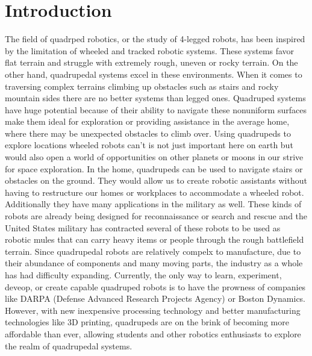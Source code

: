 \section{Introduction} \label{chap:Introduction}


    The field of quadrped robotics, or the study of 4-legged robots, has been inspired by the limitation of wheeled and tracked robotic systems. These systems favor flat terrain and struggle with extremely rough, uneven or rocky terrain. On the other hand, quadrupedal systems excel in these environments. When it comes to traversing complex terrains climbing up obstacles such as stairs and rocky mountain sides there are no better systems than legged ones. Quadruped systems have huge potential because of their ability to navigate these nonuniform surfaces make them ideal for exploration or providing assistance in the average home, where there may be unexpected obstacles to climb over. Using quadrupeds to explore locations wheeled robots can't is not just important here on earth but would also open a world of opportunities on other planets or moons in our strive for space exploration. In the home, quadrupeds can be used to navigate stairs or obstacles on the ground. They would allow us to create robotic assistants without having to restructure our homes or workplaces to accommodate a wheeled robot. Additionally they have many applications in the military as well. These kinds of robots are already being designed for reconnaissance or search and rescue and the United States military has contracted several of these robots to be used as robotic mules that can carry heavy items or people through the rough battlefield terrain. Since quadrupedal robots are relatively compelx to manufacture, due to their abundance of components and many moving parts, the industry as a whole has had difficulty expanding. Currently, the only way to learn, experiment, deveop, or create capable quadruped robots is to have the prowness of companies like DARPA (Defense Advanced Research Projects Agency) or Boston Dynamics. However, with new inexpensive processing technology and better manufacturing technologies like 3D printing, quadrupeds are on the brink of becoming more affordable than ever, allowing students and other robotics enthusiasts to explore the realm of quadrupedal systems.
    

